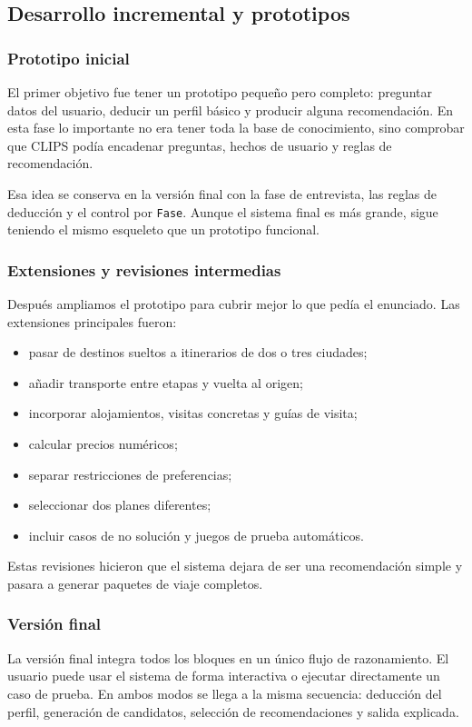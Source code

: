 \documentclass[11pt,a4paper]{article}
\begin{document}
\subsection{Desarrollo incremental y prototipos}
\subsubsection{Prototipo inicial}
El primer objetivo fue tener un prototipo peque\~no pero completo: preguntar
datos del usuario, deducir un perfil b\'asico y producir alguna recomendaci\'on.
En esta fase lo importante no era tener toda la base de conocimiento, sino
comprobar que CLIPS pod\'ia encadenar preguntas, hechos de usuario y reglas de
recomendaci\'on.

Esa idea se conserva en la versi\'on final con la fase de entrevista, las reglas
de deducci\'on y el control por \texttt{Fase}. Aunque el sistema final es m\'as
grande, sigue teniendo el mismo esqueleto que un prototipo funcional.

\subsubsection{Extensiones y revisiones intermedias}
Despu\'es ampliamos el prototipo para cubrir mejor lo que ped\'ia el enunciado.
Las extensiones principales fueron:
\begin{itemize}
    \item pasar de destinos sueltos a itinerarios de dos o tres ciudades;
    \item a\~nadir transporte entre etapas y vuelta al origen;
    \item incorporar alojamientos, visitas concretas y gu\'ias de visita;
    \item calcular precios num\'ericos;
    \item separar restricciones de preferencias;
    \item seleccionar dos planes diferentes;
    \item incluir casos de no soluci\'on y juegos de prueba autom\'aticos.
\end{itemize}

Estas revisiones hicieron que el sistema dejara de ser una recomendaci\'on
simple y pasara a generar paquetes de viaje completos.

\subsubsection{Versi\'on final}
La versi\'on final integra todos los bloques en un \'unico flujo de razonamiento.
El usuario puede usar el sistema de forma interactiva o ejecutar directamente
un caso de prueba. En ambos modos se llega a la misma secuencia: deducci\'on del
perfil, generaci\'on de candidatos, selecci\'on de recomendaciones y salida
explicada.
\end{document}
